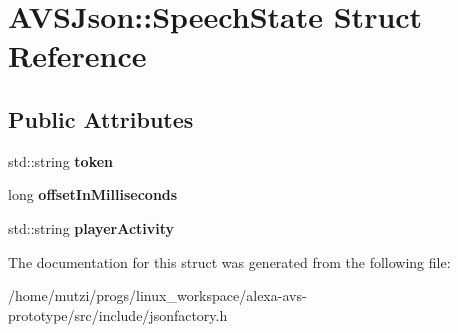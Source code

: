 \hypertarget{structAVSJson_1_1SpeechState}{}\section{A\+V\+S\+Json\+:\+:Speech\+State Struct Reference}
\label{structAVSJson_1_1SpeechState}
\subsection*{Public Attributes}
\begin{DoxyCompactItemize}
\item 
\mbox{\label{structAVSJson_1_1SpeechState_ad7804b99a11d58480642eb6771a77e94}} 
std\+::string {\bfseries token}
\item 
\mbox{\label{structAVSJson_1_1SpeechState_a343954dfa5bdb1af1f9939b279709afe}} 
long {\bfseries offset\+In\+Milliseconds}
\item 
\mbox{\label{structAVSJson_1_1SpeechState_a6f0cbc9d555e97028f9bfbd0c12f8041}} 
std\+::string {\bfseries player\+Activity}
\end{DoxyCompactItemize}


The documentation for this struct was generated from the following file\+:\begin{DoxyCompactItemize}
\item 
/home/mutzi/progs/linux\+\_\+workspace/alexa-\/avs-\/prototype/src/include/jsonfactory.\+h\end{DoxyCompactItemize}
